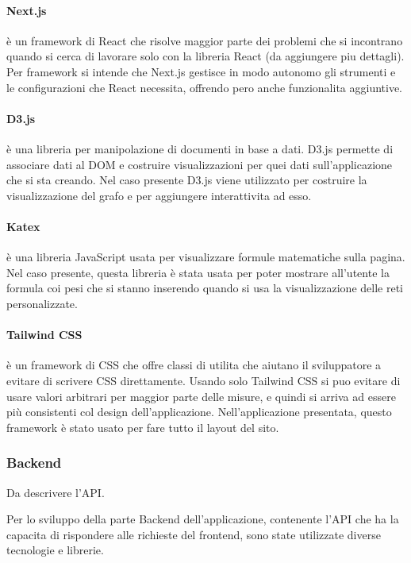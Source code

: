 \documentclass[a4paper,12pt]{report}
\begin{document}
			\paragraph*{Next.js} è un framework di React che risolve maggior parte dei problemi che si incontrano quando si cerca di lavorare solo con la libreria React (da aggiungere piu dettagli). Per framework si intende che Next.js gestisce in modo autonomo gli strumenti e le configurazioni che React necessita, offrendo pero anche funzionalita aggiuntive. \cite{nextjs} 

			\paragraph*{D3.js} è una libreria per manipolazione di documenti in base a dati. D3.js permette di associare dati al DOM e costruire visualizzazioni per quei dati sull’applicazione che si sta creando. Nel caso presente D3.js viene utilizzato per costruire la visualizzazione del grafo e per aggiungere interattivita ad esso. \cite{d3js} 

			\paragraph*{Katex} è una libreria JavaScript usata per visualizzare formule matematiche sulla pagina. Nel caso presente, questa libreria è stata usata per poter mostrare all’utente la formula coi pesi che si stanno inserendo quando si usa la visualizzazione delle reti personalizzate. \cite{katex} 

			\paragraph*{Tailwind CSS} è un framework di CSS che offre classi di utilita che aiutano il sviluppatore a evitare di scrivere CSS direttamente. Usando solo Tailwind CSS si puo evitare di usare valori arbitrari per maggior parte delle misure, e quindi si arriva ad essere più consistenti col design dell’applicazione. Nell’applicazione presentata, questo framework è stato usato per fare tutto il layout del sito. \cite{tailwindcss} 

			\subsubsection{Backend}
			
			Da descrivere l'API.

			Per lo sviluppo della parte Backend dell'applicazione, contenente l'API che ha la capacita di rispondere alle richieste del frontend, sono state utilizzate diverse tecnologie e librerie.
\end{document}
